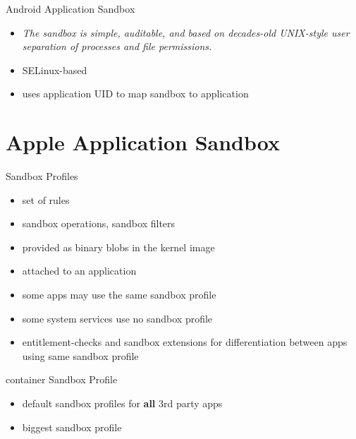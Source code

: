 \documentclass{curs}
\begin{document}


\begin{frame}{Android Application Sandbox}
  \begin{itemize}
    \pause \item \textit{The sandbox is simple, auditable, and based on decades-old UNIX-style user separation of processes and file permissions.}
    \pause \item SELinux-based
    \pause \item uses application UID to map sandbox to application
  \end{itemize}
\end{frame}

\section{Apple Application Sandbox}

\begin{frame}{Sandbox Profiles}
  \begin{itemize}
    \pause \item set of rules
    \pause \item sandbox operations, sandbox filters
    \pause \item provided as binary blobs in the kernel image
    \pause \item attached to an application
    \pause \item some apps may use the same sandbox profile
    \pause \item some system services use no sandbox profile
    \pause \item entitlement-checks and sandbox extensions for differentiation between apps using same sandbox profile
  \end{itemize}
\end{frame}

\begin{frame}{container Sandbox Profile}
  \begin{itemize}
    \pause \item default sandbox profiles for \textbf{all} 3rd party apps
    \pause \item biggest sandbox profile
  \end{itemize}
\end{frame}
\end{document}
